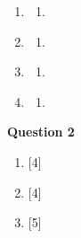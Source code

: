 \begin{enumerate}[label=(\roman*)]
    \item 

        \begin{multicols}{2}
        \begin{enumerate}[label=(\alph*)]
            \item 
        \end{enumerate}
        \end{multicols}

    \item 

        \begin{multicols}{2}
        \begin{enumerate}[label=(\alph*)]
            \item 
        \end{enumerate}
        \end{multicols}

    \item 

        \begin{multicols}{2}
        \begin{enumerate}[label=(\alph*)]
            \item 
        \end{enumerate}
        \end{multicols}

    \item 

        \begin{multicols}{2}
        \begin{enumerate}[label=(\alph*)]
            \item 
        \end{enumerate}
        \end{multicols}

\end{enumerate}

\par
\noindent
\textbf{Question 2}\\
\begin{enumerate}[label=(\roman*)]

    \item \hfill [4]

    \item \hfill [4]

    \item \hfill [5]

\end{enumerate}
